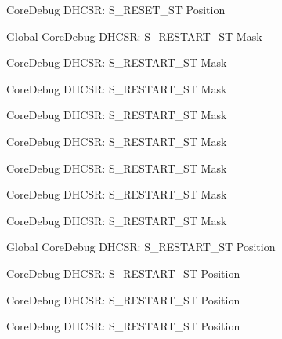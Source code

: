 \begin{DoxyRefList}
\label{deprecated__deprecated000562}%
%
Core\+Debug DHCSR\+: S\+\_\+\+RESET\+\_\+\+ST Position  
\item[Global \doxylink{group___c_m_s_i_s___s_c_b_gabe3254d40aaa482987ff31584d2a3240}{Core\+Debug\+\_\+\+DHCSR\+\_\+\+S\+\_\+\+RESTART\+\_\+\+ST\+\_\+\+Msk} ]\label{deprecated__deprecated000008}%
%
Core\+Debug DHCSR\+: S\+\_\+\+RESTART\+\_\+\+ST Mask 

\label{deprecated__deprecated000247}%
%
Core\+Debug DHCSR\+: S\+\_\+\+RESTART\+\_\+\+ST Mask 

\label{deprecated__deprecated000380}%
%
Core\+Debug DHCSR\+: S\+\_\+\+RESTART\+\_\+\+ST Mask 

\label{deprecated__deprecated000108}%
%
Core\+Debug DHCSR\+: S\+\_\+\+RESTART\+\_\+\+ST Mask 

\label{deprecated__deprecated000459}%
%
Core\+Debug DHCSR\+: S\+\_\+\+RESTART\+\_\+\+ST Mask 

\label{deprecated__deprecated000162}%
%
Core\+Debug DHCSR\+: S\+\_\+\+RESTART\+\_\+\+ST Mask 

\label{deprecated__deprecated000304}%
%
Core\+Debug DHCSR\+: S\+\_\+\+RESTART\+\_\+\+ST Mask 

\label{deprecated__deprecated000561}%
%
Core\+Debug DHCSR\+: S\+\_\+\+RESTART\+\_\+\+ST Mask  
\item[Global \doxylink{group___c_m_s_i_s___s_c_b_gaf6498d32dbe23b8d95a12d2fbc0a65f8}{Core\+Debug\+\_\+\+DHCSR\+\_\+\+S\+\_\+\+RESTART\+\_\+\+ST\+\_\+\+Pos} ]\label{deprecated__deprecated000007}%
%
Core\+Debug DHCSR\+: S\+\_\+\+RESTART\+\_\+\+ST Position 

\label{deprecated__deprecated000107}%
%
Core\+Debug DHCSR\+: S\+\_\+\+RESTART\+\_\+\+ST Position 

\label{deprecated__deprecated000379}%
%
Core\+Debug DHCSR\+: S\+\_\+\+RESTART\+\_\+\+ST Position 

\label{deprecated__deprecated000560}%
%
Core\+Debug DHCSR\+: S\+\_\+\+RESTART\+\_\+\+ST Position 


\end{DoxyRefList}
